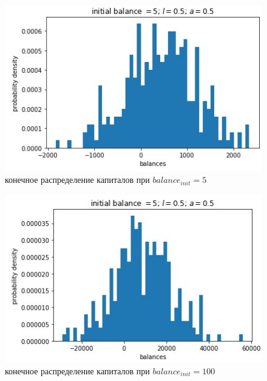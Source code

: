 \documentclass{article}
\begin{document}
\begin{figure}[H]
	\begin{minipage}[h]{0.49\linewidth}
		\centering
		\includegraphics[width=1.0\linewidth]{assets/init_balance_5.jpg}
		конечное распределение капиталов \newline при $balance_{init} = 5$
	\end{minipage}
	\hfill
\begin{minipage}[h]{0.49\linewidth}
	\centering
	\includegraphics[width=1.0\linewidth]{assets/init_balance_100.jpg}
	конечное распределение капиталов \newline при $balance_{init} = 100$
\end{minipage}
\end{figure}
\end{document}
